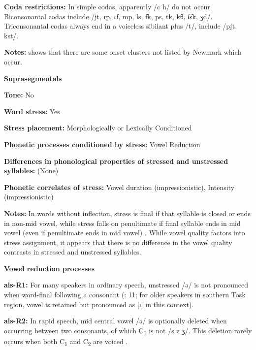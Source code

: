 \textbf{Coda restrictions:} In simple codas, apparently /c h/ do not occur. Biconsonantal codas include /jt, ɾp, ɾf, mp, ls, fk, ps, tk,  kθ, t͡sk, ʒd/. Triconsonantal codas always end in a voiceless sibilant plus /t/, include /pʃt, kst/.



\textbf{Notes:} \citet{Klippenstein2010} shows that there are some onset clusters not listed by Newmark which occur.



\textbf{Suprasegmentals}



\textbf{Tone:} No



\textbf{Word stress:} Yes



\textbf{Stress placement:} Morphologically or Lexically Conditioned



\textbf{Phonetic processes conditioned by stress:} Vowel Reduction



\textbf{Differences in phonological properties of stressed and unstressed syllables:} (None)



\textbf{Phonetic correlates of stress:} Vowel duration (impressionistic), Intensity (impressionistic)



\textbf{Notes:} In words without inflection, stress is final if that syllable is closed or ends in non-mid vowel, while stress falls on penultimate if final syllable ends in mid vowel (even if penultimate ends in mid vowel) \citep{Trommer2013}. While vowel quality factors into stress assignment, it appears that there is no difference in the vowel quality contrasts in stressed and unstressed syllables.



\textbf{Vowel reduction processes}



\textbf{als-R1:} For many speakers in ordinary speech, unstressed /ə/ is not pronounced when word-final following a consonant (\citealt{NewmarkEtAl1982}: 11; for older speakers in southern Tosk region, vowel is retained but pronounced as [ɪ] in this context).



\textbf{als-R2:} In rapid speech, mid central vowel /ə/ is optionally deleted when occurring between two consonants, of which C\textsubscript{1} is not /s z ʒ/. This deletion rarely occurs when both C\textsubscript{1} and C\textsubscript{2} are voiced \citep[21-2]{Klippenstein2010}.



